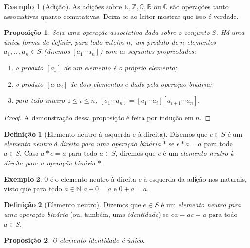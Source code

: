 \documentclass[a4paper,12pt]{article}
\theoremstyle{plain}
\newtheorem{proposicao}{Proposição}[section]
\theoremstyle{definition}
\newtheorem{definicao}{Definição}[section]
\newtheorem{exemplo}{Exemplo}[section]
\begin{document}
\begin{exemplo}[Adição]
	As adições sobre $\mathbb{N},\mathbb{Z},\mathbb{Q},\mathbb{R}$ ou $\mathbb{C}$ são operações tanto associativas quanto comutativas. Deixa-se ao leitor mostrar que isso é verdade.
\end{exemplo}

\begin{proposicao}
	Seja uma operação associativa dada sobre o conjunto
	\(S\). Há uma única forma de definir, para todo inteiro \(n\), um
	produto de \(n\) elementos \(a_1,\dots,a_n \in S\) (diremos
	\([a_1\dotsb a_n]\)) com as seguintes propriedades:
	
	\begin{enumerate}
		\def\labelenumi{\arabic{enumi}.}
		\item
		o produto \([a_1]\) de um elemento é o próprio elemento;
		\item
		o produto \([a_1a_2]\) de dois elementos é dado pela operação binária;
		\item
		para todo inteiro \(1\leq i\leq n\),
		\([a_1\dotsb a_n] = [a_1\dotsb a_i][a_{i+1}\dotsb a_n]\).
	\end{enumerate}
\end{proposicao}

\begin{proof}
	A demonstração dessa proposição é feita por indução em \(n\).
\end{proof}

\begin{definicao}[Elemento neutro à esquerda e à direita]
	Dizemos que \(e\in S\) é um \emph{elemento neutro à direita para uma operação binária $*$} se \(e*a = a\) para todo \(a\in S\). Caso $a*e = a$ para todo $a\in S$, diremos que $e$ é um \emph{elemento neutro à direita para a operação binária $*$}.
\end{definicao}

\begin{exemplo}
	$0$ é o elemento neutro à direita e à esquerda da adição nos naturais, visto que para todo $a\in \mathbb{N}$ $a+0 = a$ e $0+a = a$.
\end{exemplo}

\begin{definicao}[Elemento neutro]
	Dizemos que \(e\in S\) é um \emph{elemento neutro para uma operação binária} (ou, também, uma \emph{identidade}) se \(ea = ae = a\) para todo \(a\in S\).
\end{definicao}

\begin{proposicao}
	O elemento identidade é único.
\end{proposicao}
\end{document}
